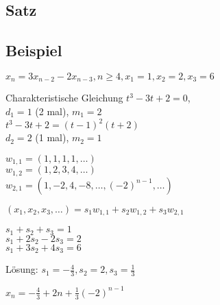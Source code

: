 \subsection{Satz} %

\subsection{Beispiel} %

$x_n = 3x_{n-2} -2x_{n-3}, n \geq 4, x_1 = 1, x_2 = 2, x_3 = 6$

Charakteristische Gleichung $t^3-3t+2 = 0$, 
\\ $d_1 = 1$ (2 mal), $m_1 =2$
\\$t^3 -3t + 2 = (t-1)^2(t+2)$
\\$d_2 =2$ (1 mal), $m_2 = 1$

$w_{1,1} = (1, 1, 1, 1, \dots)$
\\ $w_{1, 2} = (1, 2, 3, 4, \dots)$
\\ $w_{2, 1} = (1, -2, 4, -8, \dots, (-2)^{n-1}, \dots)$

$(x_1, x_2, x_3, \dots) = s_1w_{1, 1} + s_2w_{1, 2} + s_3w_{2,1}$

$s_1 + s_2 + s_3 = 1$
\\$s_1 + 2s_2 -2s_3 = 2$ 
\\$s_1 + 3s_2 + 4s_3 = 6$

Lösung: $s_1 = - \frac{4}{3}, s_2 = 2, s_3 = \frac{1}{3}$

$x_n = -\frac{4}{3} + 2n + \frac{1}{3}(-2)^{n-1}$


























